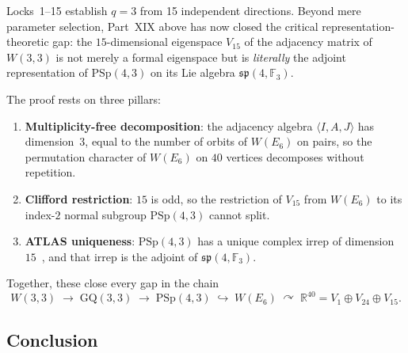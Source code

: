 Locks~1--15 establish $q = 3$ from 15 independent directions.  Beyond mere
parameter selection, Part~XIX above has now closed the critical
representation-theoretic gap: the $15$-dimensional eigenspace $V_{15}$ of the
adjacency matrix of $W(3,3)$ is not merely a formal eigenspace but is
\emph{literally} the adjoint representation of $\mathrm{PSp}(4,3)$ on its
Lie algebra $\mathfrak{sp}(4, \mathbb{F}_3)$.

The proof rests on three pillars:
\begin{enumerate}
  \item \textbf{Multiplicity-free decomposition}: the adjacency algebra
    $\langle I, A, J\rangle$ has dimension~$3$, equal to the number of orbits of
    $W(E_6)$ on pairs, so the permutation character of $W(E_6)$ on $40$ vertices
    decomposes without repetition.
  \item \textbf{Clifford restriction}: $15$ is odd, so the restriction of $V_{15}$
    from $W(E_6)$ to its index-$2$ normal subgroup $\mathrm{PSp}(4,3)$ cannot split.
  \item \textbf{ATLAS uniqueness}: $\mathrm{PSp}(4,3)$ has a unique complex irrep
    of dimension~$15$~\cite{ATLAS_part21}, and that irrep is the adjoint of
    $\mathfrak{sp}(4,\mathbb{F}_3)$.
\end{enumerate}

\noindent
Together, these close every gap in the chain
\[
  W(3,3) \;\longrightarrow\; \mathrm{GQ}(3,3) \;\longrightarrow\;
  \mathrm{PSp}(4,3) \;\hookrightarrow\; W(E_6)
  \;\curvearrowright\; \mathbb{R}^{40} = V_1 \oplus V_{24} \oplus V_{15}.
\]

\subsection{Conclusion}

\begin{center}
\end{center}

